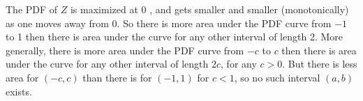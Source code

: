 

\setcounter{theorem}{26}
\begin{exercise}[BH.5.27] 
\begin{solution}
    The PDF of $Z$ is maximized at 0 , and gets smaller and smaller (monotonically) as one moves away from 0. So there is more area under the PDF curve from $-1$ to 1 then there is area under the curve for any other interval of length 2. More generally, there is more area under the PDF curve from $-c$ to $c$ then there is area under the curve for any other interval of length $2 c$, for any $c>0$. But there is less area for $(-c, c)$ than there is for $(-1,1)$ for $c<1$, so no such interval $(a, b)$ exists.
\end{solution}
\end{exercise}


